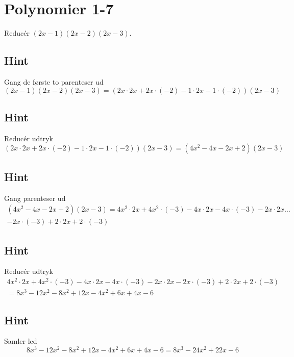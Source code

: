 \documentclass{article}
\newenvironment{exercise}[1]{\newpage\section{#1}}{}
\newcommand{\answerbox}[1]{\fbox{$#1$}}
\newcommand{\hint}{\subsection*{Hint}}
\begin{document}
\begin{exercise}{Polynomier 1-7}
	
	Reducér $(2x-1)(2x-2)(2x-3)$.
	
	\answerbox{8x^3 - 24x^2 + 22x-6}
	
	\hint
	
	Gang de første to parenteser ud
	\[
	(2x-1)(2x-2)(2x-3) = (2x \cdot 2x + 2x \cdot (-2) -1 \cdot 2x -1 \cdot (-2))(2x-3)
	\]
	
	\hint
	
	Reducér udtryk
	\[
	(2x \cdot 2x + 2x \cdot (-2) -1 \cdot 2x -1 \cdot (-2))(2x-3) = (4x^2-4x-2x+2)(2x-3)
	\]
	
	\hint

	Gang parenteser ud
	\begin{multline*}
	(4x^2-4x-2x+2)(2x-3) = 4x^2 \cdot 2x + 4x^2 \cdot (-3) -4x \cdot 2x -4x \cdot (-3)-2x \cdot 2x \ldots \\ -2x \cdot (-3) + 2 \cdot 2x + 2 \cdot (-3)
	\end{multline*}

	\hint

	Reducér udtryk
	\begin{multline*}
	4x^2 \cdot 2x + 4x^2 \cdot (-3) -4x \cdot 2x -4x \cdot (-3)-2x \cdot 2x -2x \cdot (-3) + 2 \cdot 2x + 2 \cdot (-3) \\
	=8x^3 - 12x^2 -8x^2+12x-4x^2 +6x + 4x-6
	\end{multline*}
	
	
	\hint
	
	Samler led
	\[
	8x^3 - 12x^2 -8x^2+12x-4x^2 +6x + 4x-6 = 8x^3 - 24x^2 + 22x-6
	\]
	
\end{exercise}

\newpage
\end{document}

